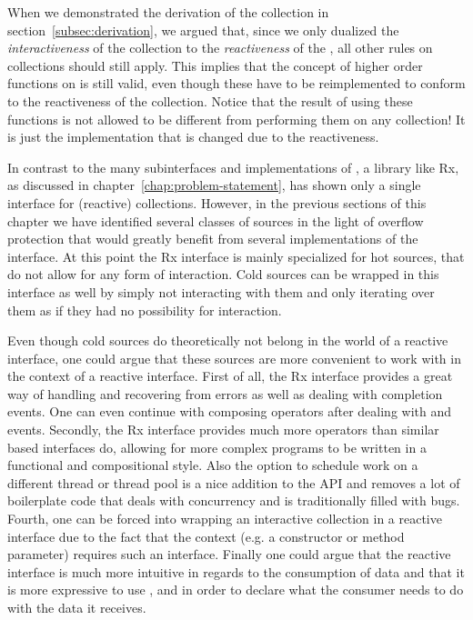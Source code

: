 When we demonstrated the derivation of the \obs collection in section~\ref{subsec:derivation}, we argued that, since we only dualized the \textit{interactiveness} of the \ieb collection to the \textit{reactiveness} of the \obs, all other rules on collections should still apply. This implies that the concept of higher order functions on \ieb is still valid, even though these have to be reimplemented to conform to the reactiveness of the \obs collection. Notice that the result of using these functions is not allowed to be different from performing them on any \ieb collection! It is just the implementation that is changed due to the reactiveness.

In contrast to the many subinterfaces and implementations of \itb, a library like Rx, as discussed in chapter~\ref{chap:problem-statement}, has shown only a single interface for (reactive) collections. However, in the previous sections of this chapter we have identified several classes of sources in the light of overflow protection that would greatly benefit from several implementations of the \obs interface. At this point the Rx interface is mainly specialized for hot sources, that do not allow for any form of interaction. Cold sources can be wrapped in this interface as well by simply not interacting with them and only iterating over them as if they had no possibility for interaction.

Even though cold sources do theoretically not belong in the world of a reactive interface, one could argue that these sources are more convenient to work with in the context of a reactive interface. First of all, the Rx interface provides a great way of handling and recovering from errors as well as dealing with completion events. One can even continue with composing operators after dealing with  and  events. Secondly, the Rx interface provides much more operators than similar \itb based interfaces do, allowing for more complex programs to be written in a functional and compositional style. Also the option to schedule work on a different thread or thread pool is a nice addition to the API and removes a lot of boilerplate code that deals with concurrency and is traditionally filled with bugs. Fourth, one can be forced into wrapping an interactive collection in a reactive interface due to the fact that the context (e.g. a constructor or method parameter) requires such an interface. Finally one could argue that the reactive interface is much more intuitive in regards to the consumption of data and that it is more expressive to use ,  and  in order to declare what the consumer needs to do with the data it receives.

